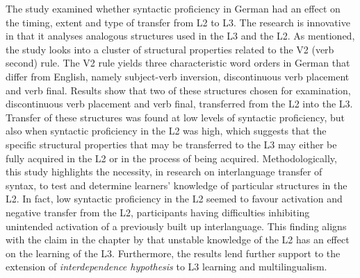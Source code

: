 \documentclass[output=paper,colorlinks,citecolor=brown,nonflat]{langsci/langscibook}
\begin{document}
The study examined whether syntactic proficiency in German had an effect on the timing, extent and type of transfer from L2 to L3. The research is innovative in that it analyses analogous structures used in the L3 and the L2. As mentioned, the study looks into a cluster of structural properties related to the V2 (verb second) rule. The V2 rule yields three characteristic word orders in German that differ from English, namely subject-verb inversion, discontinuous verb placement and verb final. Results show that two of these structures chosen for examination, discontinuous verb placement and verb final, transferred from the L2 into the L3. Transfer of these structures was found at low levels of syntactic proficiency, but also when syntactic proficiency in the L2 was high, which suggests that the specific structural properties that may be transferred to the L3 may either be fully acquired in the L2 or in the process of being acquired. Methodologically, this study highlights the necessity, in research on interlanguage transfer of syntax, to test and determine learners’ knowledge of particular structures in the L2. In fact, low syntactic proficiency in the L2 seemed to favour activation and negative transfer from the L2, participants having difficulties inhibiting unintended activation of a previously built up interlanguage. This finding aligns with the claim in the chapter by \citeauthor{chapters/pfenninger} that unstable knowledge of the L2 has an effect on the learning of the L3. Furthermore, the results lend further support to the extension of  \textit{interdependence hypothesis} to L3 learning and multilingualism.
\end{document}

